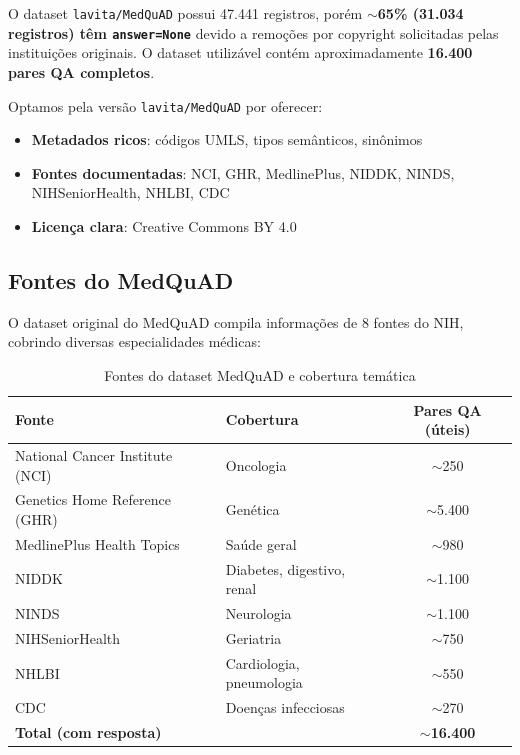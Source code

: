 \begin{warningbox}
O dataset \texttt{lavita/MedQuAD} possui 47.441 registros, porém \textbf{$\sim$65\% (31.034 registros) têm \texttt{answer=None}} devido a remoções por copyright solicitadas pelas instituições originais. O dataset utilizável contém aproximadamente \textbf{16.400 pares QA completos}.
\end{warningbox}

Optamos pela versão \texttt{lavita/MedQuAD} por oferecer:

\begin{itemize}
    \item \textbf{Metadados ricos}: códigos UMLS, tipos semânticos, sinônimos
    \item \textbf{Fontes documentadas}: NCI, GHR, MedlinePlus, NIDDK, NINDS, NIHSeniorHealth, NHLBI, CDC
    \item \textbf{Licença clara}: Creative Commons BY 4.0
\end{itemize}

\subsection{Fontes do MedQuAD}

O dataset original do MedQuAD compila informações de 8 fontes do NIH, cobrindo diversas especialidades médicas:

\begin{table}[H]
\centering
\caption{Fontes do dataset MedQuAD e cobertura temática}
\label{tab:fontes-medquad}
\begin{tabular}{llc}
\toprule
\textbf{Fonte} & \textbf{Cobertura} & \textbf{Pares QA (úteis)} \\
\midrule
National Cancer Institute (NCI) & Oncologia & $\sim$250 \\
Genetics Home Reference (GHR) & Genética & $\sim$5.400 \\
MedlinePlus Health Topics & Saúde geral & $\sim$980 \\
NIDDK & Diabetes, digestivo, renal & $\sim$1.100 \\
NINDS & Neurologia & $\sim$1.100 \\
NIHSeniorHealth & Geriatria & $\sim$750 \\
NHLBI & Cardiologia, pneumologia & $\sim$550 \\
CDC & Doenças infecciosas & $\sim$270 \\
\midrule
\textbf{Total (com resposta)} & & \textbf{$\sim$16.400} \\
\bottomrule
\end{tabular}
\end{table}

